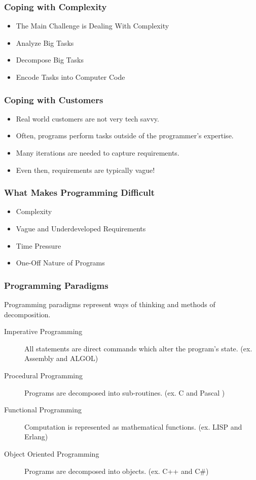 \documentclass[handout]{beamer}
\begin{document}
\begin{frame}
   \frametitle{Coping with Complexity}
   \begin{itemize}
   \item<1-> The Main Challenge is Dealing With Complexity
   \item<2-> Analyze Big Tasks
   \item<3-> Decompose Big Tasks
   \item<4-> Encode Tasks into Computer Code
   \end{itemize}
\end{frame}

\begin{frame}
   \frametitle{Coping with Customers}
   \begin{itemize}
   \item<2-> Real world customers are not very tech savvy.
   \item<3-> Often, programs perform tasks outside of the programmer's expertise.
   \item<4-> Many iterations are needed to capture requirements.
   \item<5-> Even then, requirements are typically vague!
   \end{itemize}
\end{frame}

\begin{frame}
   \frametitle{What Makes Programming Difficult}
   \begin{itemize}
   \item Complexity
   \item Vague and Underdeveloped Requirements
   \item Time Pressure
   \item One-Off Nature of Programs
   \end{itemize}
\end{frame}

\begin{frame}
   \frametitle{Programming Paradigms}
   Programming paradigms represent ways of thinking and methods of
   decomposition.
   \begin{description}
   \item[Imperative Programming] All statements are direct commands
     which alter the program's state.  (ex. Assembly and ALGOL)
   \item[Procedural Programming] Programs are decomposed into sub-routines.
     (ex. C and Pascal )
   \item[Functional Programming] Computation is represented as mathematical
     functions.  (ex. LISP and Erlang)
   \item[Object Oriented Programming] Programs are decomposed into objects.
     (ex. C++ and C\#)
   \end{description}
\end{frame}
\end{document}
